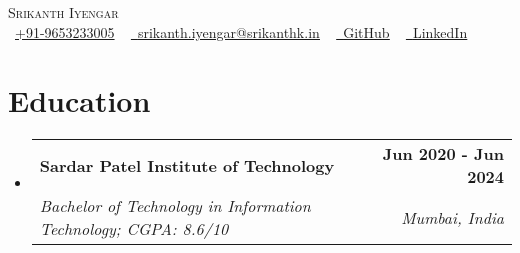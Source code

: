 \documentclass[letterpaper,11pt]{article}
\makeatletter
\newcommand{\resumeItem}[1]{
  \item\small{
	{#1 \vspace{-2pt}}
  }
}
\newcommand{\resumeSubheading}[4]{
  \vspace{4pt}\item
	\begin{tabular*}{1.0\textwidth}[t]{l@{\extracolsep{\fill}}r}
  	\textbf{#1} & \textbf{\small #2} \\
  	\textit{\small#3} & \textit{\small #4} \\
	\end{tabular*}\vspace{-7pt}
}
\newcommand{\resumeSubHeadingListStart}{\begin{itemize}[leftmargin=0.0in, label={}]}
\newcommand{\resumeSubHeadingListEnd}{\end{itemize}}
\newcommand{\resumeItemListStart}{\begin{itemize}}
\newcommand{\resumeItemListEnd}{\end{itemize}\vspace{-5pt}}
\makeatother
\begin{document}

\begin{center}
	{\Huge \scshape Srikanth Iyengar} \\ \vspace{4pt}
	\small \raisebox{-0.1\height}\faPhone\ 
	\href{tel:919653233005}{+91-9653233005} ~ 
    \href{mailto:srikanth.iyengar@srikanthk.in}{\raisebox{-0.2\height}\faEnvelope\  \underline{srikanth.iyengar@srikanthk.in}} ~
    \vspace{5pt}
	\href{https://github.com/srikanth-iyengar/}{\raisebox{-0.2\height}\faGithub\
	\underline{GitHub}} ~
	\href{https://linkedin.com/in/srikanth-iyengar-73b32620b/}{\raisebox{-0.2\height}\faLinkedin\
	\underline{LinkedIn}}
	\vspace{-2pt}
\end{center}
\vspace{-25pt}
\section{Education}
  \resumeSubHeadingListStart
    \resumeSubheading
      {Sardar Patel Institute of Technology}{Jun 2020 - Jun 2024}
      {Bachelor of Technology in Information Technology; CGPA: 8.6/10}{Mumbai, India}
  \resumeSubHeadingListEnd
\vspace{-20pt}
\end{document}
